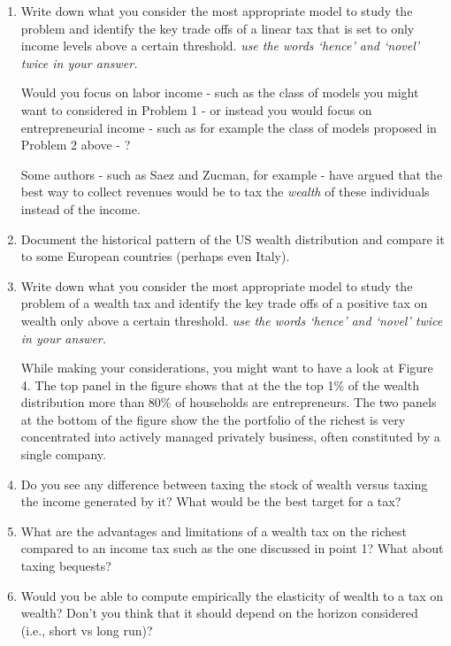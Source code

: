\documentclass[11pt,a4paper]{article}
\begin{document}
\begin{enumerate}
    \item Write down what you consider the most appropriate model to study the problem and identify the key trade offs of a linear tax that is set to only income levels above a certain threshold. \emph{use the words `hence' and `novel' twice in your answer.}

    Would you focus on labor income - such as the class of models you might want to considered in Problem 1 - or instead you would focus on entrepreneurial income - such as for example the class of models proposed in Problem 2 above - ?

    Some authors - such as Saez and Zucman, for example - have argued that the best way to collect revenues would be to tax the \emph{wealth} of these individuals instead of the income.

    \item Document the historical pattern of the US wealth distribution and compare it to some European countries (perhaps even Italy).

    \item Write down what you consider the most appropriate model to study the problem of a wealth tax and identify the key trade offs of a positive tax on wealth only above a certain threshold. \emph{use the words `hence' and `novel' twice in your answer.}

    While making your considerations, you might want to have a look at Figure 4. The top panel in the figure shows that at the the top 1\% of the wealth distribution more than 80\% of households are entrepreneurs. The two panels at the bottom of the figure show the the portfolio of the richest is very concentrated into actively managed privately business, often constituted by a single company.

    \item Do you see any difference between taxing the stock of wealth versus taxing the income generated by it? What would be the best target for a tax?
\end{enumerate}

\newpage


\begin{enumerate}
    \setcounter{enumi}{4}
    \item What are the advantages and limitations of a wealth tax on the richest compared to an income tax such as the one discussed in point 1? What about taxing bequests?

    \item Would you be able to compute empirically the elasticity of wealth to a tax on wealth? Don't you think that it should depend on the horizon considered (i.e., short vs long run)?
\end{enumerate}
\end{document}
